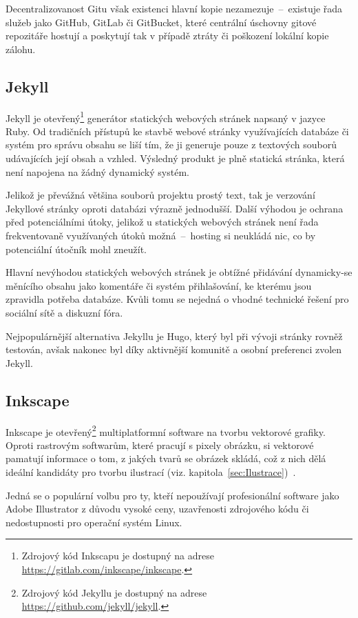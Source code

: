 \documentclass[a4paper, 12pt]{article}
\begin{document}
  Decentralizovanost Gitu však existenci hlavní kopie nezamezuje~--~existuje řada služeb jako GitHub, GitLab či GitBucket, které centrální úschovny gitové repozitáře hostují a poskytují tak v případě ztráty či poškození lokální kopie zálohu.


  \subsection{Jekyll} \label{sec:Jekyll}
  Jekyll je otevřený\footnote{Zdrojový kód Inkscapu je dostupný na adrese \url{https://gitlab.com/inkscape/inkscape}.} generátor statických webových stránek napsaný v jazyce Ruby. Od tradičních přístupů ke stavbě webové stránky využívajících databáze či systém pro správu obsahu se liší tím, že ji generuje pouze z textových souborů udávajících její obsah a vzhled. Výsledný produkt je plně statická stránka, která není napojena na žádný dynamický systém.

  Jelikož je převážná většina souborů projektu prostý text, tak je verzování Jekyllové stránky oproti databázi výrazně jednodušší. Další výhodou je ochrana před potenciálními útoky, jelikož u statických webových stránek není řada frekventovaně využívaných útoků možná~--~hosting si neukládá nic, co by potenciální útočník mohl zneužít.

  Hlavní nevýhodou statických webových stránek je obtížné přidávání dynamicky-se měnícího obsahu jako komentáře či systém přihlašování, ke kterému jsou zpravidla potřeba databáze. Kvůli tomu se nejedná o vhodné technické řešení pro sociální sítě a diskuzní fóra.

  Nejpopulárnější alternativa Jekyllu je Hugo, který byl při vývoji stránky rovněž testován, avšak nakonec byl díky aktivnější komunitě a osobní preferenci zvolen Jekyll.


  \subsection{Inkscape} \label{sec:Inkscape}
  Inkscape je otevřený\footnote{Zdrojový kód Jekyllu je dostupný na adrese \url{https://github.com/jekyll/jekyll}.} multiplatformní software na tvorbu vektorové grafiky. Oproti rastrovým softwarům, které pracují s pixely obrázku, si vektorové pamatují informace o tom, z jakých tvarů se obrázek skládá, což z nich dělá ideální kandidáty pro tvorbu ilustrací (viz. kapitola~\ref{sec:Ilustrace})~\cite{vector-vs-bitmap}.

  Jedná se o populární volbu pro ty, kteří nepoužívají profesionální software jako Adobe Illustrator z důvodu vysoké ceny, uzavřenosti zdrojového kódu či nedostupnosti pro operační systém Linux.
\end{document}
